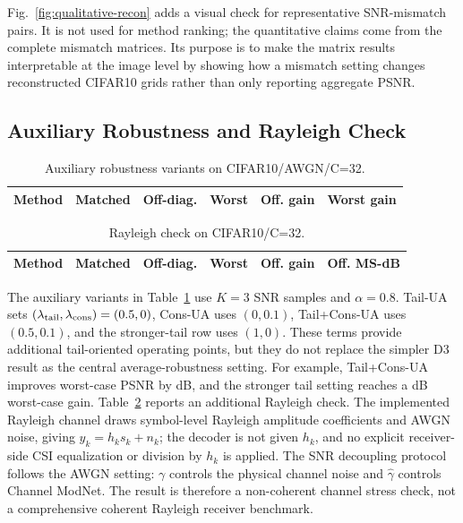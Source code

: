 \documentclass[10pt,journal]{IEEEtran}
\begin{document}


Fig.~\ref{fig:qualitative-recon} adds a visual check for representative SNR-mismatch pairs. It is not used for method ranking; the quantitative claims come from the complete mismatch matrices. Its purpose is to make the matrix results interpretable at the image level by showing how a mismatch setting changes reconstructed CIFAR10 grids rather than only reporting aggregate PSNR.

\subsection{Auxiliary Robustness and Rayleigh Check}

\begin{table}[t]
\caption{Auxiliary robustness variants on CIFAR10/AWGN/C=32.}
\label{tab:auxiliary}
\centering
\scriptsize
\begin{tabular}{lrrrrr}
\toprule
Method & Matched & Off-diag. & Worst & Off. gain & Worst gain\\
\midrule

\bottomrule
\end{tabular}
\end{table}

\begin{table}[t]
\caption{Rayleigh check on CIFAR10/C=32.}
\label{tab:rayleigh}
\centering
\scriptsize
\begin{tabular}{lrrrrr}
\toprule
Method & Matched & Off-diag. & Worst & Off. gain & Off. MS-dB\\
\midrule

\bottomrule
\end{tabular}
\end{table}

The auxiliary variants in Table~\ref{tab:auxiliary} use $K=3$ SNR samples and $\alpha=0.8$. Tail-UA sets $(\lambda_{\rm tail},\lambda_{\rm cons})=(0.5,0)$, Cons-UA uses $(0,0.1)$, Tail+Cons-UA uses $(0.5,0.1)$, and the stronger-tail row uses $(1,0)$. These terms provide additional tail-oriented operating points, but they do not replace the simpler D3 result as the central average-robustness setting. For example, Tail+Cons-UA improves worst-case PSNR by \TailConsWorstGain{} dB, and the stronger tail setting reaches a \TailLtOneWorstGain{} dB worst-case gain. Table~\ref{tab:rayleigh} reports an additional Rayleigh check. The implemented Rayleigh channel draws symbol-level Rayleigh amplitude coefficients and AWGN noise, giving $y_k=h_k s_k+n_k$; the decoder is not given $h_k$, and no explicit receiver-side CSI equalization or division by $h_k$ is applied. The SNR decoupling protocol follows the AWGN setting: $\gamma$ controls the physical channel noise and $\hat{\gamma}$ controls Channel ModNet. The result is therefore a non-coherent channel stress check, not a comprehensive coherent Rayleigh receiver benchmark.
\end{document}
